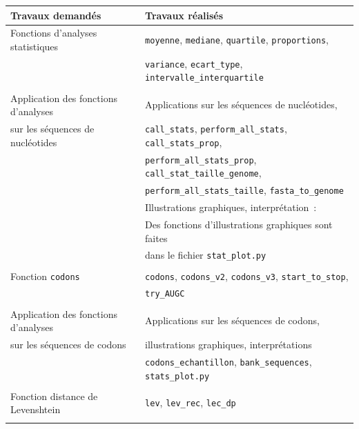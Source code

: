 \documentclass[12pt]{article}
\begin{document}
        \begin{table}[!h]
            \centering
            \begin{tabular}{|l|l|}
                \hline
                Travaux demandés & Travaux réalisés \\
                \hline
                Fonctions d'analyses statistiques & \texttt{moyenne},  \texttt{mediane}, \texttt{quartile}, \texttt{proportions}, \\
                 & \texttt{variance}, \texttt{ecart\_type}, \texttt{intervalle\_interquartile} \\
                 & \\
                Application des fonctions d'analyses & Applications sur les séquences de nucléotides, \\
                sur les séquences de nucléotides & \texttt{call\_stats}, \texttt{perform\_all\_stats}, \texttt{call\_stats\_prop}, \\
                 & \texttt{perform\_all\_stats\_prop}, \texttt{call\_stat\_taille\_genome}, \\
                 & \texttt{perform\_all\_stats\_taille}, \texttt{fasta\_to\_genome} \\
                 & Illustrations graphiques, interprétation~: \\
                 & Des fonctions d'illustrations graphiques sont faites \\
                 & dans le fichier \texttt{stat\_plot.py} \\
                 & \\
                Fonction \texttt{codons} & \texttt{codons}, \texttt{codons\_v2}, \texttt{codons\_v3}, \texttt{start\_to\_stop}, \\
                 & \texttt{try\_AUGC} \\
                 & \\
                Application des fonctions d'analyses & Applications sur les séquences de codons, \\
                sur les séquences de codons & illustrations graphiques, interprétations \\
                 & \texttt{codons\_echantillon}, \texttt{bank\_sequences}, \texttt{stats\_plot.py} \\
                 & \\
                Fonction distance de Levenshtein & \texttt{lev}, \texttt{lev\_rec}, \texttt{lec\_dp} \\
                 & \\

\end{tabular}
\end{table}
\end{document}
